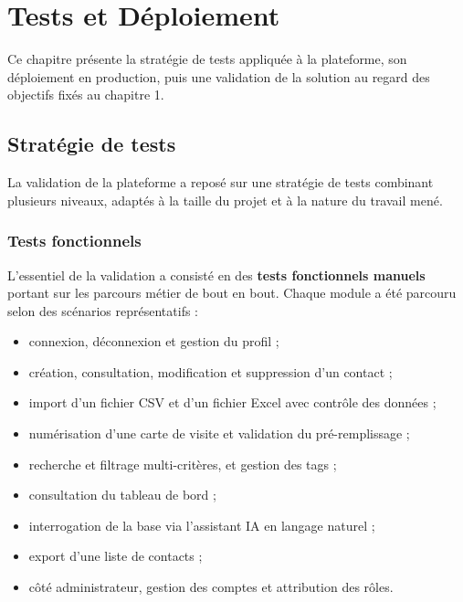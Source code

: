 
\chapter{Tests et Déploiement}

Ce chapitre présente la stratégie de tests appliquée à la plateforme, son déploiement en production, puis une validation de la solution au regard des objectifs fixés au chapitre 1.

\section{Stratégie de tests}

La validation de la plateforme a reposé sur une stratégie de tests combinant plusieurs niveaux, adaptés à la taille du projet et à la nature du travail mené.

\subsection{Tests fonctionnels}

L'essentiel de la validation a consisté en des \textbf{tests fonctionnels manuels} portant sur les parcours métier de bout en bout. Chaque module a été parcouru selon des scénarios représentatifs :

\begin{itemize}[leftmargin=*,itemsep=3pt]
  \item connexion, déconnexion et gestion du profil ;
  \item création, consultation, modification et suppression d'un contact ;
  \item import d'un fichier CSV et d'un fichier Excel avec contrôle des données ;
  \item numérisation d'une carte de visite et validation du pré-remplissage ;
  \item recherche et filtrage multi-critères, et gestion des tags ;
  \item consultation du tableau de bord ;
  \item interrogation de la base via l'assistant IA en langage naturel ;
  \item export d'une liste de contacts ;
  \item côté administrateur, gestion des comptes et attribution des rôles.
\end{itemize}

